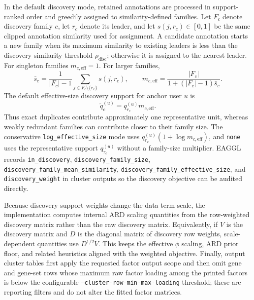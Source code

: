 \documentclass[11pt]{article}
\begin{document}
In the default discovery mode, retained annotations are processed in support-ranked order and greedily assigned to similarity-defined families. Let $F_c$ denote discovery family $c$, let $r_c$ denote its leader, and let $s(j,r_c) \in [0,1]$ be the same clipped annotation similarity used for assignment. A candidate annotation starts a new family when its maximum similarity to existing leaders is less than the discovery similarity threshold $\rho_{\mathrm{disc}}$; otherwise it is assigned to the nearest leader. For singleton families $m_{c,\mathrm{eff}}=1$. For larger families,
\begin{equation}
\bar s_c = \frac{1}{|F_c|-1}\sum_{j \in F_c \setminus \{r_c\}} s(j,r_c),
\qquad
m_{c,\mathrm{eff}} = \frac{|F_c|}{1 + (|F_c|-1)\bar s_c}.
\label{eq:eaggl_discovery_effective_size}
\end{equation}
The default effective-size discovery support for anchor user $u$ is
\begin{equation}
\tilde q_c^{(u)} = q_{r_c}^{(u)} m_{c,\mathrm{eff}}.
\label{eq:eaggl_discovery_effective_weight}
\end{equation}
Thus exact duplicates contribute approximately one representative unit, whereas weakly redundant families can contribute closer to their family size. The conservative \texttt{log\_effective\_size} mode uses $q_{r_c}^{(u)}(1+\log m_{c,\mathrm{eff}})$, and \texttt{none} uses the representative support $q_{r_c}^{(u)}$ without a family-size multiplier. EAGGL records \texttt{in\_discovery}, \texttt{discovery\_family\_size}, \texttt{discovery\_family\_mean\_similarity}, \texttt{discovery\_family\_effective\_size}, and \texttt{discovery\_weight} in cluster outputs so the discovery objective can be audited directly.

Because discovery support weights change the data term scale, the implementation computes internal ARD scaling quantities from the row-weighted discovery matrix rather than the raw discovery matrix. Equivalently, if $V$ is the discovery matrix and $D$ is the diagonal matrix of discovery row weights, scale-dependent quantities use $D^{1/2}V$. This keeps the effective $\phi$ scaling, ARD prior floor, and related heuristics aligned with the weighted objective. Finally, output cluster tables first apply the requested factor output scope and then omit gene and gene-set rows whose maximum raw factor loading among the printed factors is below the configurable \texttt{--cluster-row-min-max-loading} threshold; these are reporting filters and do not alter the fitted factor matrices.
\end{document}
